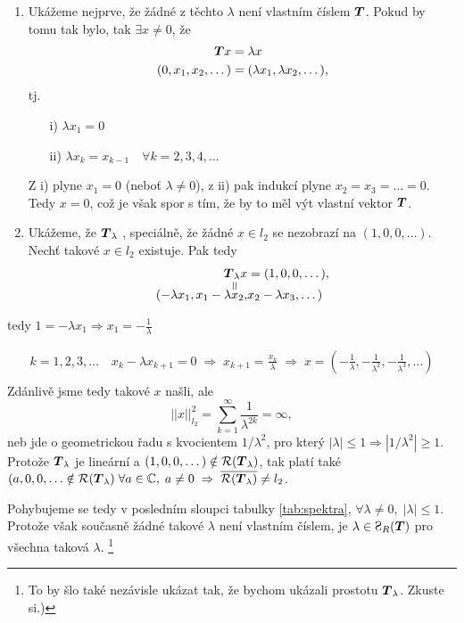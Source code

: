 \begin{enumerate}
    \item Ukážeme nejprve, že žádné z těchto $\lambda$ není vlastním číslem $\boldsymbol{T}$. Pokud by tomu tak bylo, tak $\exists x\neq0$, že
    \begin{align*}
        \boldsymbol{T} x&=\lambda x\\
        (0,x_1,x_2,\dots)&=(\lambda x_1,\lambda x_2,\dots),
    \end{align*}
    tj. \begin{enumerate}
        \item[i)] $\lambda x_1=0$
        \item[ii)] $\lambda x_k=x_{k-1} \quad \forall k=2,3,4,\dots$
    \end{enumerate}
    Z i) plyne $x_1=0$ (neboť $\lambda\neq 0$), z ii) pak indukcí plyne $x_2=x_3=\dots=0$. Tedy $x=0$, což je však spor s tím, že by to měl výt vlastní vektor $\boldsymbol{T}$.
    \item Ukážeme, že $\boldsymbol{T}_\lambda$ , speciálně, že žádné $x\in l_2$ se nezobrazí na $(1,0,0,\dots)$. Nechť takové $x\in l_2$ existuje. Pak tedy
    \begin{align*}
        \underset{\rotatebox[origin=c]{90}{=}}{\map T_\lambda x} &= (1,0,0,\dots),\\[-7pt]
        (-\lambda x_1,x_1-\lambda x_2,&x_2-\lambda x_3,\dots )
    \end{align*}
\end{enumerate}
tedy $1=-\lambda x_1 \Rightarrow x_1=-\frac{1}{\lambda}$

\begin{align*}
    k=1,2,3,\dots \quad x_k-\lambda x_{k+1}=0 \;\Rightarrow\; x_{k+1}=\frac{x_k}{\lambda} \;\Rightarrow\; x=\left(-\frac{1}{\lambda},-\frac{1}{\lambda^2},-\frac{1}{\lambda^3},\dots\right)\\
\end{align*}
Zdánlivě jsme tedy takové $x$ našli, ale $$ ||x||_{l_2}^2=\sum\limits_{k=1}^\infty\frac{1}{\lambda^{2k}}=\infty,$$
neb jde o geometrickou řadu s kvocientem $1/\lambda^2$, pro který $|\lambda|\leq 1 \Rightarrow |1/\lambda^2|\geq 1$.
Protože $\boldsymbol{T}_\lambda$ je lineární a $(1,0,0,\dots)\notin \mathcal{R}(\boldsymbol{T}_\lambda)$, tak platí také $(a,0,0,\dots \notin \mathcal{R}(\boldsymbol{T}_\lambda)\; \forall a \in \mathbb{C},\;a\neq0\;\Rightarrow\;\overline{\mathcal{R}(\boldsymbol{T}_\lambda)}\neq l_2$.

Pohybujeme se tedy v posledním sloupci tabulky \ref{tab:spektra}, $\forall \lambda \neq0,\; |\lambda|\leq1$. Protože však současně žádné takové $\lambda$ není vlastním číslem, je $\lambda \in \Sp_R(\map T)$ pro všechna taková $\lambda$. \footnote{To by šlo také nezávisle ukázat tak, že bychom ukázali prostotu $\boldsymbol{T}_\lambda$. Zkuste si.)}

